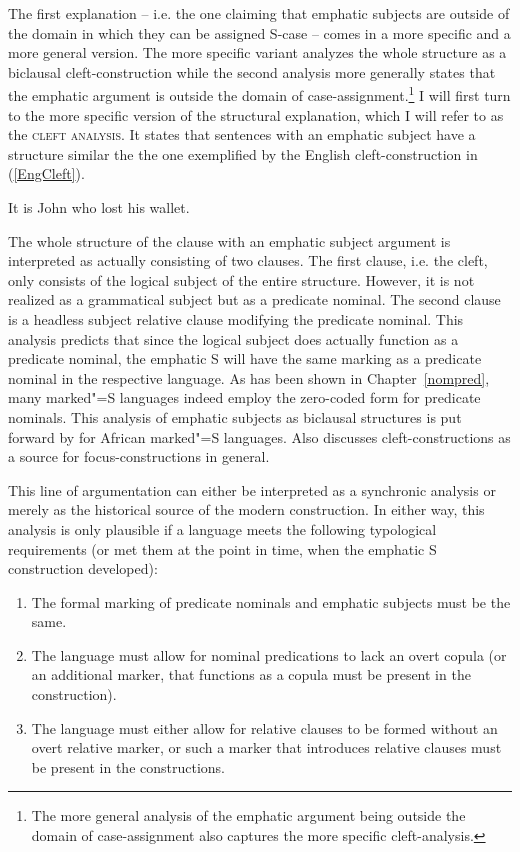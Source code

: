 The first explanation -- i.e. the one claiming that emphatic subjects are outside of the domain in which they can be assigned S-case -- comes in a more specific and a more general version. 
The more specific variant analyzes the whole structure as a biclausal cleft-construction while the second analysis more generally states that the emphatic argument is outside the domain of case-assignment.\footnote{The more general analysis of the emphatic argument being outside the domain of case-assignment also captures the more specific cleft-analysis.}
I will first turn to the more specific version of the structural explanation, which I will refer to as the \textsc{cleft analysis}. 
It states that sentences with an emphatic subject have a structure similar the the one exemplified by the English cleft-construction in (\ref{EngCleft}).

\begin{exe} \ex\label{EngCleft}It is John who lost his wallet.
\end{exe}

The whole structure of the clause with an emphatic subject argument is interpreted as actually consisting of two clauses.
The first clause, i.e. the cleft, only consists of the logical subject of the entire structure. 
However, it is not realized as a grammatical subject but as a predicate nominal. 
The second clause is a headless subject relative clause modifying the predicate nominal. 
This analysis predicts that since the logical subject does actually function as a predicate nominal, the emphatic S will have the same marking as a predicate nominal in the respective language. 
As has been shown in Chapter~\ref{nompred}, many marked"=S languages indeed employ the zero-coded form for predicate nominals. 
This analysis of emphatic subjects as biclausal structures is put forward by \citet{Koenig:2008} for African marked"=S languages. 
Also \citet[278--281]{Payne:1997} discusses cleft-constructions as a source for focus-constructions in general.

This line of argumentation can either be interpreted as a synchronic analysis or merely as the historical source of the modern construction. 
In either way, this analysis is only plausible if a language meets the following typological requirements (or met them at the point in time, when the emphatic S construction developed): 

\begin{enumerate}
\item The formal marking of predicate nominals and emphatic subjects must be the same.
\item The language must allow for nominal predications to lack an overt copula (or an additional marker, that functions as a copula must be present in the construction).
\item The language must either allow for relative clauses to be formed without an overt relative marker, or such a marker that introduces relative clauses must be present in the constructions.  
\end{enumerate}

